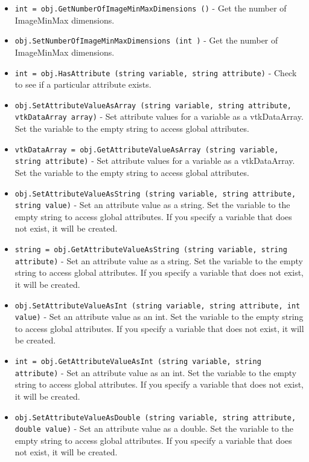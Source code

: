 \begin{itemize}
\item  \verb|int = obj.GetNumberOfImageMinMaxDimensions ()| -  Get the number of ImageMinMax dimensions.

\item  \verb|obj.SetNumberOfImageMinMaxDimensions (int )| -  Get the number of ImageMinMax dimensions.

\item  \verb|int = obj.HasAttribute (string variable, string attribute)| -  Check to see if a particular attribute exists.

\item  \verb|obj.SetAttributeValueAsArray (string variable, string attribute, vtkDataArray array)| -  Set attribute values for a variable as a vtkDataArray.
 Set the variable to the empty string to access global attributes.

\item  \verb|vtkDataArray = obj.GetAttributeValueAsArray (string variable, string attribute)| -  Set attribute values for a variable as a vtkDataArray.
 Set the variable to the empty string to access global attributes.

\item  \verb|obj.SetAttributeValueAsString (string variable, string attribute, string value)| -  Set an attribute value as a string.  Set the variable
 to the empty string to access global attributes.
 If you specify a variable that does not exist, it will be
 created.

\item  \verb|string = obj.GetAttributeValueAsString (string variable, string attribute)| -  Set an attribute value as a string.  Set the variable
 to the empty string to access global attributes.
 If you specify a variable that does not exist, it will be
 created.

\item  \verb|obj.SetAttributeValueAsInt (string variable, string attribute, int value)| -  Set an attribute value as an int. Set the variable
 to the empty string to access global attributes.
 If you specify a variable that does not exist, it will be
 created.

\item  \verb|int = obj.GetAttributeValueAsInt (string variable, string attribute)| -  Set an attribute value as an int. Set the variable
 to the empty string to access global attributes.
 If you specify a variable that does not exist, it will be
 created.

\item  \verb|obj.SetAttributeValueAsDouble (string variable, string attribute, double value)| -  Set an attribute value as a double.  Set the variable
 to the empty string to access global attributes.
 If you specify a variable that does not exist, it will be
 created.


\end{itemize}
